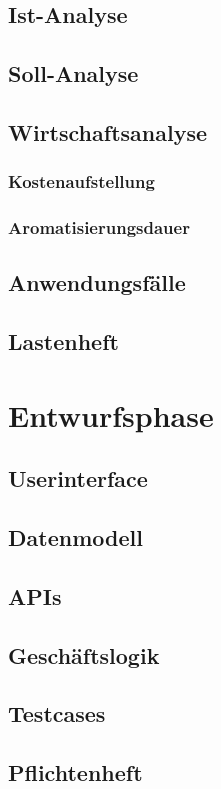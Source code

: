 \documentclass[12pt,a4paper,oneside]{article}
\begin{document}
    \subsection{Ist-Analyse}
    \subsection{Soll-Analyse}
    \subsection{Wirtschaftsanalyse}
    \subsubsection{Kostenaufstellung}
    \subsubsection{Aromatisierungsdauer}
    \subsection{Anwendungsfälle}
    \subsection{Lastenheft}
    \section{Entwurfsphase}
    \subsection{Userinterface}
    \subsection{Datenmodell}
    \subsection{APIs}
    \subsection{Geschäftslogik}
    \subsection{Testcases}
    \subsection{Pflichtenheft}
\end{document}
